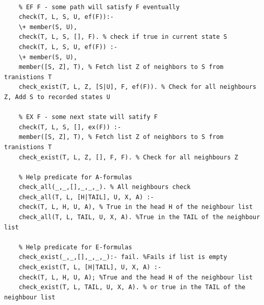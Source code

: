 \documentclass[]{article}
\begin{document}
\begin{verbatim}
	
	% EF F - some path will satisfy F eventually
	check(T, L, S, U, ef(F)):-
	\+ member(S, U),
	check(T, L, S, [], F). % check if true in current state S
	check(T, L, S, U, ef(F)) :-
	\+ member(S, U),
	member([S, Z], T), % Fetch list Z of neighbors to S from tranistions T
	check_exist(T, L, Z, [S|U], F, ef(F)). % Check for all neighbours Z, Add S to recorded states U
	
	% EX F - some next state will satify F
	check(T, L, S, [], ex(F)) :-
	member([S, Z], T), % Fetch list Z of neighbors to S from tranistions T
	check_exist(T, L, Z, [], F, F). % Check for all neighbours Z
	
	% Help predicate for A-formulas
	check_all(_,_,[],_,_,_). % All neighbours check
	check_all(T, L, [H|TAIL], U, X, A) :-
	check(T, L, H, U, A), % True in the head H of the neighbour list
	check_all(T, L, TAIL, U, X, A). %True in the TAIL of the neighbour list
	
	% Help predicate for E-formulas
	check_exist(_,_,[],_,_,_):- fail. %Fails if list is empty
	check_exist(T, L, [H|TAIL], U, X, A) :-
	check(T, L, H, U, A); %True and the head H of the neighbour list
	check_exist(T, L, TAIL, U, X, A). % or true in the TAIL of the neighbour list
	
\end{verbatim}
\end{document}
